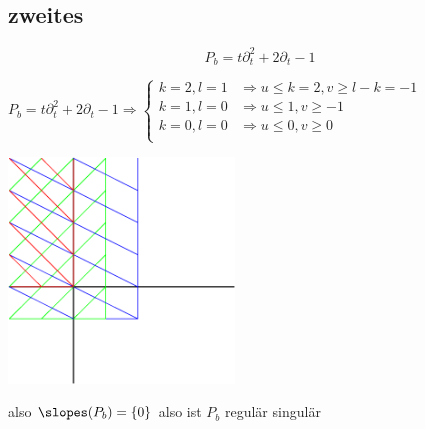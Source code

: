 \subsection{zweites}
\[
  P_b=t\partial_t^2+2\partial_t-1
\]

$
P_b=t\partial_t^2+2\partial_t-1 \Rightarrow 
\begin{cases}
  k=2,l=1 & \Rightarrow u\leq k=2, v\geq l-k=-1\\
  k=1,l=0 & \Rightarrow u\leq 1, v\geq -1\\
  k=0,l=0 & \Rightarrow u\leq 0, v\geq 0\\
\end{cases}
$

\begin{center}
  \includegraphics[width=6cm]{img/b.png}
\end{center}
also $\slopes(P_b)=\{0\}$ also ist $P_b$ regulär singulär

